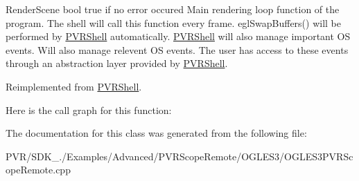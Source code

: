   Render\+Scene  bool true if no error occured  Main rendering loop function of the program. The shell will call this function every frame. egl\+Swap\+Buffers() will be performed by \hyperlink{class_p_v_r_shell}{P\+V\+R\+Shell} automatically. \hyperlink{class_p_v_r_shell}{P\+V\+R\+Shell} will also manage important O\+S events. Will also manage relevent O\+S events. The user has access to these events through an abstraction layer provided by \hyperlink{class_p_v_r_shell}{P\+V\+R\+Shell}. 

Reimplemented from \hyperlink{class_p_v_r_shell_ae0eb5f797cbe993a22b8659f9c332578}{P\+V\+R\+Shell}.



Here is the call graph for this function\+:




The documentation for this class was generated from the following file\+:\begin{DoxyCompactItemize}
\item 
P\+V\+R/\+S\+D\+K\+\_./\+Examples/\+Advanced/\+P\+V\+R\+Scope\+Remote/\+O\+G\+L\+E\+S3/O\+G\+L\+E\+S3\+P\+V\+R\+Scope\+Remote.\+cpp\end{DoxyCompactItemize}
